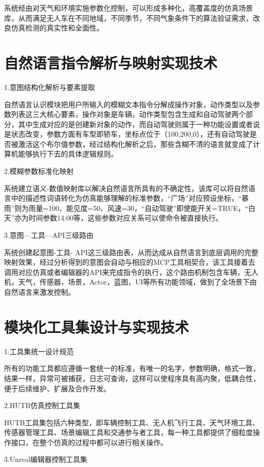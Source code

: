 系统经由对天气和环境实施参数化控制，可以形成多种化，高覆盖度的仿真场景库，从而满足无人车在不同地域，不同季节，不同气象条件下的算法验证需求，改良仿真检测的真实性和全面性。

\section{自然语言指令解析与映射实现技术}

1.意图结构化解析与要素提取

自然语言认识模块把用户所输入的模糊文本指令分解成操作对象，动作类型以及参数列表这三大核心要素，操作对象是车辆，动作类型包含生成和自动驾驶两个部分，其中生成对应的是创建新对象的动作，而自动驾驶则属于一种功能设置或者说是状态改变，参数方面有车型即轿车，坐标点位于（100,200,0），还有自动驾驶是否被激活这个布尔值参数，经过结构化解析之后，那些含糊不清的语言就变成了计算机能够执行下去的具体逻辑规则。

2.模糊参数标准化映射

系统建立语义-数值映射库以解决自然语言所具有的不确定性，该库可以将自然语言中的描述性词语转化为仿真能够理解的标准参数，``广场''对应预设坐标，``暴雨''则为雨量=100、能见度=50、风速=30，``自动驾驶''即使能开关=TRUE，``白天''亦为时间参数14:00等，这些参数对应关系可以使命令被直接执行。

3.意图---工具---API三级路由

系统创建起意图-工具-
API这三级路由表，从而达成从自然语言到底层调用的完整映射效果，经过分析得到的意图会自动与相应的MCP工具相契合，该工具接着去调用对应仿真或者编辑器的API来完成指令的执行，这个路由机制包含车辆，无人机，天气，传感器，场景，Actor，蓝图，UI等所有功能领域，做到了全场景下由自然语言来激发控制。

\section{模块化工具集设计与实现技术}

1.工具集统一设计规范

所有的功能工具都应遵循一套统一的标准，有唯一的名字，参数明确，格式一致，结果一样，异常可被捕获，日志可查询，这样可以使程序具有高内聚，低耦合性，便于后续维护、扩展及合作开发。

2.HUTB仿真控制工具集

HUTB工具集包括六种类型，即车辆控制工具、无人机飞行工具、天气环境工具、传感器管理工具、场景编辑工具和交通参与者工具，每一种工具都提供了细粒度操作接口，在整个仿真的过程中都可以进行相关操作。

3.Unreal编辑器控制工具集

